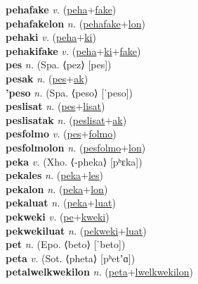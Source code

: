 \textbf{pehafake} \textit{v.} (\hyperref[peha]{peha}+\hyperref[fake]{fake})
 \label{pehafake} \\
\textbf{pehafakelon} \textit{n.} (\hyperref[pehafake]{pehafake}+\hyperref[lon]{lon})
 \label{pehafakelon} \\
\textbf{pehaki} \textit{v.} (\hyperref[peha]{peha}+\hyperref[ki]{ki})
 \label{pehaki} \\
\textbf{pehakifake} \textit{v.} (\hyperref[peha]{peha}+\hyperref[ki]{ki}+\hyperref[fake]{fake})
 \label{pehakifake} \\
\textbf{pes} \textit{n.} (Spa. ⟨pez⟩ [pes])
 \label{pes} \\
\textbf{pesak} \textit{n.} (\hyperref[pes]{pes}+\hyperref[ak]{ak})
 \label{pesak} \\
\textbf{'peso} \textit{n.} (Spa. ⟨peso⟩ [ˈpeso])
 \label{'peso} \\
\textbf{peslisat} \textit{n.} (\hyperref[pes]{pes}+\hyperref[lisat]{lisat})
 \label{peslisat} \\
\textbf{peslisatak} \textit{n.} (\hyperref[peslisat]{peslisat}+\hyperref[ak]{ak})
 \label{peslisatak} \\
\textbf{pesfolmo} \textit{v.} (\hyperref[pes]{pes}+\hyperref[folmo]{folmo})
 \label{pesfolmo} \\
\textbf{pesfolmolon} \textit{n.} (\hyperref[pesfolmo]{pesfolmo}+\hyperref[lon]{lon})
 \label{pesfolmolon} \\
\textbf{peka} \textit{v.} (Xho. ⟨-pheka⟩ [pʰɛka])
 \label{peka} \\
\textbf{pekales} \textit{n.} (\hyperref[peka]{peka}+\hyperref[les]{les})
 \label{pekales} \\
\textbf{pekalon} \textit{n.} (\hyperref[peka]{peka}+\hyperref[lon]{lon})
 \label{pekalon} \\
\textbf{pekaluat} \textit{n.} (\hyperref[peka]{peka}+\hyperref[luat]{luat})
 \label{pekaluat} \\
\textbf{pekweki} \textit{v.} (\hyperref[pe]{pe}+\hyperref[kweki]{kweki})
 \label{pekweki} \\
\textbf{pekwekiluat} \textit{n.} (\hyperref[pekweki]{pekweki}+\hyperref[luat]{luat})
 \label{pekwekiluat} \\
\textbf{pet} \textit{n.} (Epo. ⟨beto⟩ [ˈbeto])
 \label{pet} \\
\textbf{peta} \textit{v.} (Sot. ⟨pheta⟩ [pʰetʼɑ])
 \label{peta} \\
\textbf{petalwelkwekilon} \textit{n.} (\hyperref[peta]{peta}+\hyperref[lwelkwekilon]{lwelkwekilon})
 \label{petalwelkwekilon} \\
